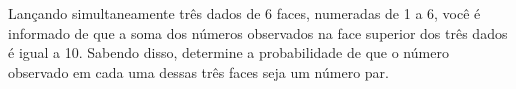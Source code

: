 %
%


\begin{exercicioBanco}[\valorquestao]

Lançando simultaneamente três dados de 6 faces, numeradas de 1 a 6, você é informado de que a soma dos números observados na face superior dos três dados é igual a 10. Sabendo disso, determine a probabilidade de que o número observado em cada uma dessas três faces seja um número par.

\end{exercicioBanco}


